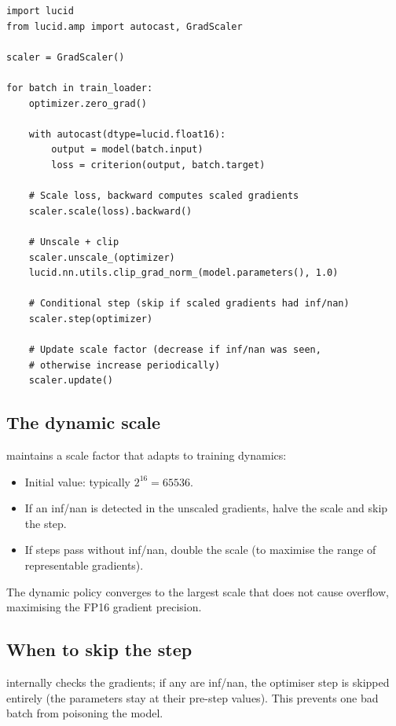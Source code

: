\begin{lstlisting}[style=lucid,language=LucidPython]
import lucid
from lucid.amp import autocast, GradScaler

scaler = GradScaler()

for batch in train_loader:
    optimizer.zero_grad()

    with autocast(dtype=lucid.float16):
        output = model(batch.input)
        loss = criterion(output, batch.target)

    # Scale loss, backward computes scaled gradients
    scaler.scale(loss).backward()

    # Unscale + clip
    scaler.unscale_(optimizer)
    lucid.nn.utils.clip_grad_norm_(model.parameters(), 1.0)

    # Conditional step (skip if scaled gradients had inf/nan)
    scaler.step(optimizer)

    # Update scale factor (decrease if inf/nan was seen,
    # otherwise increase periodically)
    scaler.update()
\end{lstlisting}

\subsection{The dynamic scale}
\label{ssec:amp:dynamic_scale}

 maintains a scale factor that adapts to
training dynamics:

\begin{itemize}
  \item Initial value: typically $2^{16} = 65536$.
  \item If an inf/nan is detected in the unscaled gradients,
    halve the scale and skip the step.
  \item If  steps pass without
    inf/nan, double the scale (to maximise the range of
    representable gradients).
\end{itemize}

The dynamic policy converges to the largest scale that does not
cause overflow, maximising the FP16 gradient precision.

\subsection{When to skip the step}
\label{ssec:amp:skip_step}

 internally checks the gradients;
if any are inf/nan, the optimiser step is skipped entirely (the
parameters stay at their pre-step values). This prevents one bad
batch from poisoning the model.

